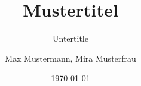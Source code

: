 \author{
	Max Mustermann,
	Mira Musterfrau
}
\titlehead{Fachbereich}
\subject{Grund der Arbeit}
\title{Mustertitel}
\subtitle{Untertitle}
\date{\today}
\publishers{HERAUSGEBER}
